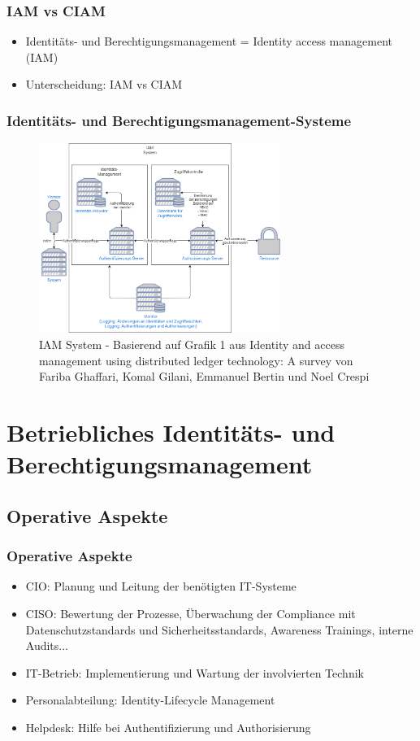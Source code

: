 \documentclass[11pt]{beamer}
\begin{document}
\begin{frame}
  \frametitle{IAM vs CIAM}
  \begin{itemize}
    \item Identitäts- und Berechtigungsmanagement = Identity access management (IAM)
    \item Unterscheidung: IAM vs CIAM
  \end{itemize}
\end{frame}

\begin{frame}
  \frametitle{Identitäts- und Berechtigungsmanagement-Systeme}
  \begin{figure}[H]
    \centering
    \includegraphics[width=0.7\textwidth]{assets/accessmanagement2.png}
    \caption{IAM System - Basierend auf Grafik 1 aus \glqq{}Identity and access management using distributed ledger technology: A survey\grqq{} von Fariba Ghaffari, Komal Gilani, Emmanuel Bertin und Noel Crespi}\label{figure:iam}
  \end{figure}
\end{frame}

\section{Betriebliches Identitäts- und Berechtigungsmanagement}

\subsection{Operative Aspekte}
\begin{frame}
  \frametitle{Operative Aspekte}
  \begin{itemize}
    \item CIO: Planung und Leitung der benötigten IT-Systeme
    \item CISO: Bewertung der Prozesse, Überwachung der Compliance mit Datenschutzstandards und Sicherheitsstandards, Awareness Trainings, interne Audits...
    \item IT-Betrieb: Implementierung und Wartung der involvierten Technik
    \item Personalabteilung: Identity-Lifecycle Management
    \item Helpdesk: Hilfe bei Authentifizierung und Authorisierung
  \end{itemize}
\end{frame}
\end{document}
